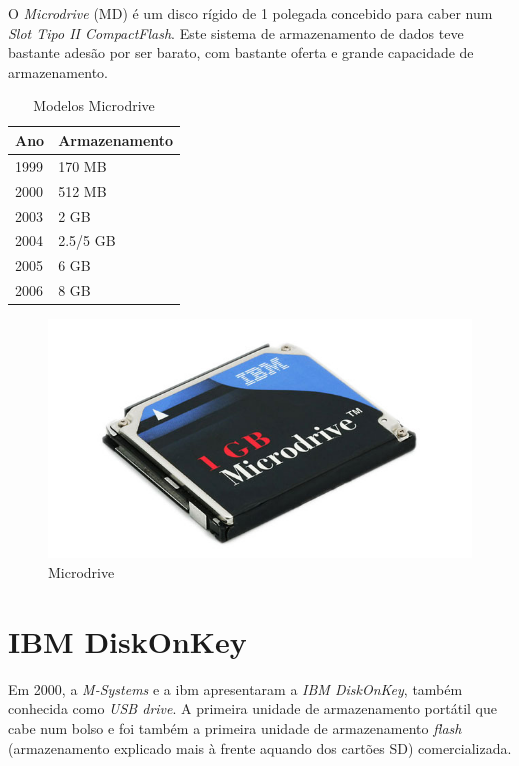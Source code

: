 \documentclass{report}
\begin{document}
	O \textit{Microdrive} (MD) é um disco rígido de 1 polegada concebido para caber num \textit{Slot Tipo II CompactFlash}.
	Este sistema de armazenamento de dados teve bastante adesão por ser barato, com bastante oferta e grande capacidade de armazenamento. 
	
	\begin{table}[h]
		\centering
		\caption{Modelos Microdrive} 
		\vspace{2mm}
		\label{Tabela de Microdive}
		\begin{tabular}{|l|l|}
		\hline
		\textbf{Ano} & \textbf{Armazenamento} \\ \hline
			1999 & 170  MB \\ \hline
			2000 & 512  MB \\ \hline
			2003 & 2  GB \\ \hline
			2004 & 2.5/5  GB  \\ \hline
			2005 & 6  GB  \\ \hline
			2006 & 8  GB  \\ \hline
			\end{tabular}
		\end{table}
	
	\begin{figure} [h]
		\centering
		\includegraphics[scale=0.3]{microdrive.jpg}
		\caption{Microdrive}
	\end{figure}

\newpage

		
		
		\section{IBM DiskOnKey}
		\label{IBM DiskonKey}
		
		
		Em 2000, a \textit{M-Systems} e a \ac{ibm} apresentaram a \textit{IBM DiskOnKey}, também conhecida como \textit{USB drive}. A primeira unidade de armazenamento portátil que cabe num bolso e foi também a primeira unidade de armazenamento \textit{flash}  (armazenamento explicado mais à frente aquando dos cartões SD) comercializada.
\vspace{3mm}		
		 
\end{document}
